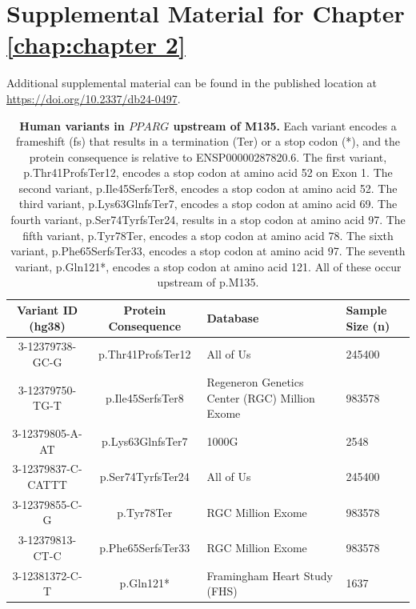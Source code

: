 \chapter{Supplemental Material for Chapter \ref{chap:chapter 2}}

Additional supplemental material can be found in the published location at \url{https://doi.org/10.2337/db24-0497}. 

\begin{table}[ht]
    \centering
    \caption[Human variants in \texorpdfstring{\(PPARG\)}{PPARG} upstream of M135.]{\textbf{Human variants in \texorpdfstring{\(PPARG\)}{PPARG} upstream of M135.} Each variant encodes a frameshift (fs) that results in a termination (Ter) or a stop codon (*), and the protein consequence is relative to ENSP00000287820.6. The first variant, p.Thr41ProfsTer12, encodes a stop codon at amino acid 52 on Exon 1. The second variant, p.Ile45SerfsTer8, encodes a stop codon at amino acid 52. The third variant, p.Lys63GlnfsTer7, encodes a stop codon at amino acid 69. The fourth variant, p.Ser74TyrfsTer24, results in a stop codon at amino acid 97. The fifth variant, p.Tyr78Ter, encodes a stop codon at amino acid 78. The sixth variant, p.Phe65SerfsTer33, encodes a stop codon at amino acid 97. The seventh variant, p.Gln121*, encodes a stop codon at amino acid 121. All of these occur upstream of p.M135.
  }
    \begin{tabular}{|c|c|m{4.2cm}|m{2cm}|}
    \hline
        Variant ID (hg38) & Protein Consequence & Database & Sample Size \newline (n) \\ \hline
        3-12379738-GC-G & p.Thr41ProfsTer12 & All of Us & 245400 \\ \hline
        3-12379750-TG-T & p.Ile45SerfsTer8 & Regeneron Genetics Center (RGC) Million Exome & 983578 \\ \hline
        3-12379805-A-AT & p.Lys63GlnfsTer7 & 1000G & 2548 \\ \hline
        3-12379837-C-CATTT & p.Ser74TyrfsTer24 & All of Us & 245400 \\ \hline
        3-12379855-C-G & p.Tyr78Ter & RGC Million Exome & 983578 \\ \hline
        3-12379813-CT-C & p.Phe65SerfsTer33 & RGC Million Exome & 983578 \\ \hline
        3-12381372-C-T & p.Gln121* & Framingham Heart Study (FHS) & 1637 \\ \hline
    \end{tabular}
\end{table}


